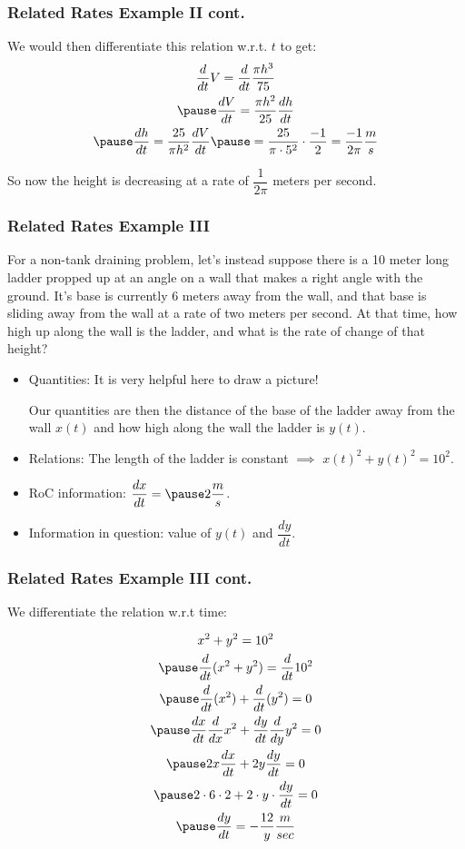 \documentclass{ltx-talk}
\begin{document}
\begin{frame}
  \frametitle{Related Rates Example II cont.}
  We would then differentiate this relation w.r.t. $t$ to get:
  \begin{gather}
    \dfrac{d}{dt} V = \dfrac{d}{dt} \dfrac{\pi h^3}{75} \\ \pause
    \dfrac{dV}{dt}  = \dfrac{\pi h^2}{25} \dfrac{dh}{dt} \\ \pause
    \dfrac{dh}{dt} = \dfrac{25}{\pi h^2} \dfrac{dV}{dt} \pause = \dfrac{25}{\pi \cdot 5^2} \cdot \dfrac{-1}{2} = \dfrac{-1}{2\pi} \dfrac{m}{s}
  \end{gather}

  So now the height is decreasing at a rate of $\dfrac{1}{2\pi}$ meters per second.
\end{frame}

\begin{frame}
  \frametitle{Related Rates Example III}
  For a non-tank draining problem, let's instead suppose there
  is a 10 meter long ladder propped up at an angle on a wall that makes a right angle with the ground.
  It's base is currently 6 meters away from the wall, and that base is sliding away from the wall at a rate of two meters per second.
  At that time, how high up along the wall is the ladder, and what is the rate of change of that height? \pause

  \begin{itemize}
    \item Quantities: It is very helpful here to draw a picture! \pause 

      Our quantities are then the distance of the base of the ladder away from the wall $x(t)$ and how high along the wall the ladder is $y(t)$. \pause
    \item Relations: \pause The length of the ladder is constant $\implies$ \pause $x(t)^2 + y(t)^2 = 10^2$. \pause
    \item RoC information: \pause $\dfrac{dx}{dt} = \pause 2 \dfrac{m}{s}$. \pause
    \item Information in question: value of $y(t)$ and $\dfrac{dy}{dt}$.
  \end{itemize}
\end{frame}

\begin{frame}
  \frametitle{Related Rates Example III cont.}
  We differentiate the relation w.r.t time:

  \begin{gather}
    x^2 + y^2 = 10^2 \\ \pause
    \dfrac{d}{dt} (x^2 + y^2) = \dfrac{d}{dt} 10^2 \\ \pause
    \dfrac{d}{dt} (x^2) + \dfrac{d}{dt} (y^2) = 0 \\ \pause
    \dfrac{dx}{dt} \dfrac{d}{dx} x^2 + \dfrac{dy}{dt} \dfrac{d}{dy} y^2 = 0 \\ \pause
    2x \dfrac{dx}{dt} + 2y \dfrac{dy}{dt} = 0 \\ \pause
    2 \cdot 6 \cdot 2 + 2 \cdot y \cdot \dfrac{dy}{dt} = 0 \\ \pause
    \dfrac{dy}{dt} = -\dfrac{12}{y} \dfrac{m}{sec}
  \end{gather}
\end{frame}
\end{document}
